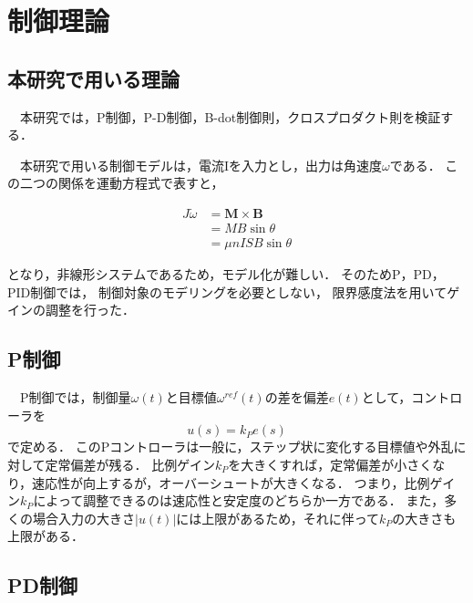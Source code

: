 \section{制御理論}

\subsection{本研究で用いる理論}
　本研究では，P制御，P-D制御，B-dot制御則，クロスプロダクト則を検証する．

　本研究で用いる制御モデルは，電流Iを入力とし，出力は角速度$\omega$である．
この二つの関係を運動方程式で表すと，

\begin{equation}
    \begin{aligned}
        J\dot{\omega} &= \boldsymbol{M \times B}\\
                       &= MB\sin\theta\\
                       &= \mu nISB\sin\theta
    \end{aligned}
\end{equation}

となり，非線形システムであるため，モデル化が難しい．
そのためP，PD，PID制御では，
制御対象のモデリングを必要としない，
限界感度法を用いてゲインの調整を行った．



\subsection{P制御}

　P制御では，制御量$\omega(t)$と目標値$\omega^{ref}(t)$の差を偏差$e(t)$として，コントローラを
\begin{equation}
    u(s) = k_Pe(s)
\end{equation}
で定める．
このPコントローラは一般に，ステップ状に変化する目標値や外乱に対して定常偏差が残る．
比例ゲイン$k_P$を大きくすれば，定常偏差が小さくなり，速応性が向上するが，オーバーシュートが大きくなる．
つまり，比例ゲイン$k_P$によって調整できるのは速応性と安定度のどちらか一方である．
また，多くの場合入力の大きさ$|u(t)|$には上限があるため，それに伴って$k_P$の大きさも上限がある．


\subsection{PD制御}

